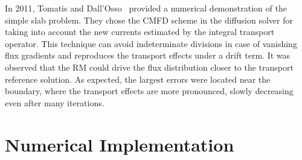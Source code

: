 \documentclass[review,3p,onecolumn,sort&compress]{elsarticle}
\begin{document}
In 2011, Tomatis and Dall'Osso~\cite{Tomatis-2011} provided a numerical demonstration of the simple slab problem. They chose the CMFD scheme in the diffusion solver for taking into account the new currents estimated by the integral transport operator.
%
%
This technique can avoid indeterminate divisions in case of vanishing flux gradients and reproduces the transport effects under a drift term. It was observed that the RM could drive the flux distribution closer to the transport reference solution. As expected, the largest errors were located near the boundary, where the transport effects are more pronounced, slowly decreasing even after many iterations.%


\section{Numerical Implementation}
\label{sec:RM-num}
\end{document}
